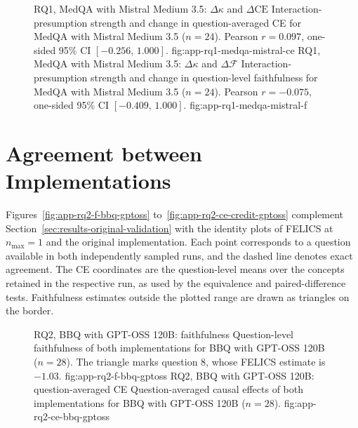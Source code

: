 \begin{figure}[H]
  \centering
    {RQ1, MedQA with Mistral Medium 3.5: $\Delta\kappa$ and $\Delta\mathrm{CE}$}%
    {Interaction-presumption strength and change in question-averaged CE for MedQA with Mistral Medium 3.5 ($n=24$). Pearson $r=0.097$, one-sided 95\% CI $[-0.256,\,1.000]$.}%
    {fig:app-rq1-medqa-mistral-ce}%
  \hfill
    {RQ1, MedQA with Mistral Medium 3.5: $\Delta\kappa$ and $\Delta\mathcal{F}$}%
    {Interaction-presumption strength and change in question-level faithfulness for MedQA with Mistral Medium 3.5 ($n=24$). Pearson $r=-0.075$, one-sided 95\% CI $[-0.409,\,1.000]$.}%
    {fig:app-rq1-medqa-mistral-f}%
\end{figure}

\section{Agreement between Implementations}
\label{app:rq2-identity}

Figures~\ref{fig:app-rq2-f-bbq-gptoss} to~\ref{fig:app-rq2-ce-credit-gptoss} complement Section~\ref{sec:results-original-validation} with the identity plots of FELICS at $n_{\max}=1$ and the original implementation. Each point corresponds to a question available in both independently sampled runs, and the dashed line denotes exact agreement. The CE coordinates are the question-level means over the concepts retained in the respective run, as used by the equivalence and paired-difference tests. Faithfulness estimates outside the plotted range are drawn as triangles on the border.

\begin{figure}[H]
  \centering
    {RQ2, BBQ with GPT-OSS 120B: faithfulness}%
    {Question-level faithfulness of both implementations for BBQ with GPT-OSS 120B ($n=28$). The triangle marks question 8, whose FELICS estimate is $-1.03$.}%
    {fig:app-rq2-f-bbq-gptoss}%
  \hfill
    {RQ2, BBQ with GPT-OSS 120B: question-averaged CE}%
    {Question-averaged causal effects of both implementations for BBQ with GPT-OSS 120B ($n=28$).}%
    {fig:app-rq2-ce-bbq-gptoss}%
\end{figure}

